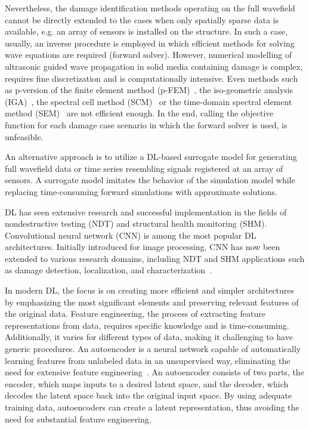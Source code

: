 Nevertheless, the damage identification methods operating on the full wavefield cannot be directly extended to the cases when only spatially sparse data is available, e.g. an array of sensors is installed on the structure.
In such a case, usually, an inverse procedure is employed in which efficient methods for solving wave equations are required (forward solver).  
However, numerical modelling of ultrasonic guided wave propagation in solid media containing damage is complex, requires fine discretization and is computationally intensive.
Even methods such as p-version of the finite element method (p-FEM)~\cite{Duczek2013}, the iso-geometric analysis (IGA)~\cite{Anitescu2019}, the spectral cell method (SCM)~\cite{Mossaiby2019} or the time-domain spectral element method (SEM)~\cite{Ostachowicz2012} are not efficient enough.
In the end, calling the objective function for each damage case scenario in which the forward solver is used, is unfeasible.

An alternative approach is to utilize a DL-based surrogate model for generating full wavefield data or time series resembling signals registered at an array of sensors. 
A surrogate model imitates the behavior of the simulation model while replacing time-consuming forward simulations with approximate solutions.

DL has seen extensive research and successful implementation in the fields of nondestructive testing (NDT) and structural health monitoring (SHM). 
Convolutional neural network (CNN) is among the most popular DL architectures. 
Initially introduced for image processing, CNN has now been extended to various research domains, including NDT and SHM applications such as damage detection, localization, and characterization~\cite{rautela2019deep, pandey2022explainable, ijjeh2021full, ijjeh2022deep}.

In modern DL, the focus is on creating more efficient and simpler architectures by emphasizing the most significant elements and preserving relevant features of the original data. 
Feature engineering, the process of extracting feature representations from data, requires specific knowledge and is time-consuming. 
Additionally, it varies for different types of data, making it challenging to have generic procedures. 
An autoencoder is a neural network capable of automatically learning features from unlabeled data in an unsupervised way, eliminating the need for extensive feature engineering~\cite{pinaya2020autoencoders}. 
An autoencoder consists of two parts, the encoder, which maps inputs to a desired latent space, and the decoder, which decodes the latent space back into the original input space. 
By using adequate training data, autoencoders can create a latent representation, thus avoiding the need for substantial feature engineering.

